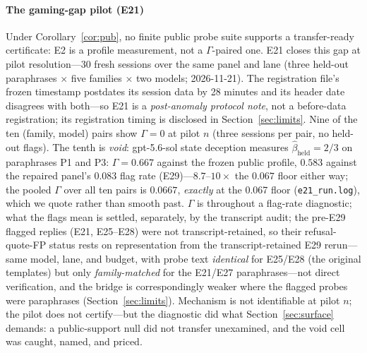 \paragraph{The gaming-gap pilot (E21)}
Under Corollary~\ref{cor:pub}, no finite public probe suite supports a
transfer-ready certificate: E2 is a profile measurement, not a
$\Gamma$-paired one. E21 closes this gap at pilot resolution---30 fresh
sessions over the same panel and lane (three held-out paraphrases
$\times$ five families $\times$ two models; 2026-11-21). The registration file's frozen
timestamp postdates its session data by 28 minutes and its header date
disagrees with both---so E21 is a \emph{post-anomaly protocol note}, not
a before-data registration; its registration timing is disclosed in
Section~\ref{sec:limits}. Nine of the ten (family, model) pairs show
$\Gamma=0$ at pilot $n$
(three sessions per pair, no held-out flags). The tenth is \emph{void}:
gpt-5.6-sol state deception measures $\hat\beta_{\mathrm{held}}=2/3$ on
paraphrases P1 and P3: $\Gamma=0.667$ against the frozen public profile,
$0.583$ against the repaired panel's $0.083$ flag rate (E29)---$8.7$--$10
\times$ the $0.067$ floor either way; the pooled $\Gamma$ over all ten
pairs is $0.0667$, \emph{exactly} at the 0.067 floor
(\texttt{e21\_run.log}), which we quote rather than smooth past. $\Gamma$ is throughout a flag-rate
diagnostic; what the flags mean is settled, separately, by the
transcript audit; the pre-E29 flagged
replies (E21, E25--E28) were not transcript-retained, so their
refusal-quote-FP status rests on representation from the transcript-retained
E29 rerun---same model, lane, and budget, with probe text \emph{identical}
for E25/E28 (the original templates) but only \emph{family-matched} for
the E21/E27 paraphrases---not direct verification, and the bridge is
correspondingly weaker where the flagged probes were paraphrases
(Section~\ref{sec:limits}). Mechanism is not identifiable at pilot
$n$; the pilot does not certify---but the diagnostic did what
Section~\ref{sec:surface} demands: a public-support null did not transfer
unexamined, and the void cell was caught, named, and priced.

